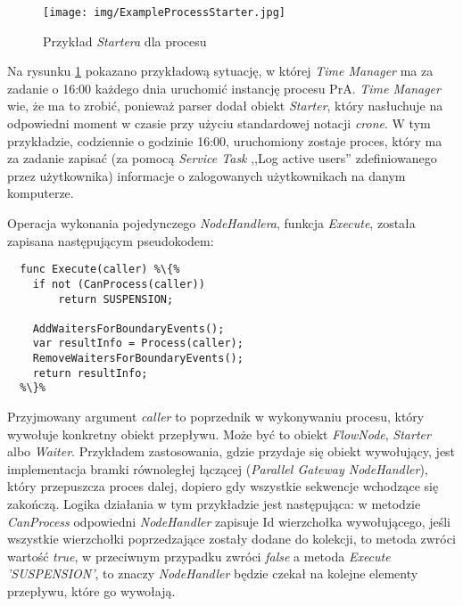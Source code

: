 \documentclass[declaration,shortabstract,mgr]{iithesis}
\begin{document}
\begin{figure}[H]
    \texttt{[image: img/ExampleProcessStarter.jpg]}
    \caption{Przykład \textit{Startera} dla procesu}
    \label{fig:process-example-starter}
\end{figure}

Na rysunku \ref{fig:process-example-starter} pokazano przykładową sytuację, w której \textit{Time Manager} ma za zadanie o 16:00 każdego dnia uruchomić instancję procesu PrA. \textit{Time Manager} wie, że ma to zrobić, ponieważ parser dodał obiekt \textit{Starter}, który nasłuchuje na odpowiedni moment w czasie przy użyciu standardowej notacji \textit{crone}. W tym przykładzie, codziennie o godzinie 16:00, uruchomiony zostaje proces, który ma za zadanie zapisać (za pomocą \textit{Service Task} ,,Log active users'' zdefiniowanego przez użytkownika) informacje o zalogowanych użytkownikach na danym komputerze.

Operacja wykonania pojedynczego \textit{NodeHandlera}, funkcja \textit{Execute}, została zapisana następującym pseudokodem:

\begin{minipage}[c]{\textwidth}
\centering
\begin{lstlisting}
  func Execute(caller) %\{%
    if not (CanProcess(caller))
        return SUSPENSION;

    AddWaitersForBoundaryEvents();
    var resultInfo = Process(caller);
    RemoveWaitersForBoundaryEvents();
    return resultInfo;  
  %\}%
\end{lstlisting}
\end{minipage}

Przyjmowany argument \textit{caller} to poprzednik w wykonywaniu procesu, który wywołuje konkretny obiekt przepływu. Może być to obiekt \textit{FlowNode}, \textit{Starter} albo \textit{Waiter}. Przykładem zastosowania, gdzie przydaje się obiekt wywołujący, jest implementacja bramki równoległej łączącej (\textit{Parallel Gateway NodeHandler}), który przepuszcza proces dalej, dopiero gdy wszystkie sekwencje wchodzące się zakończą. Logika działania w tym przykładzie jest następująca: w metodzie \textit{CanProcess} odpowiedni \textit{NodeHandler} zapisuje Id wierzchołka wywołującego, jeśli wszystkie wierzchołki poprzedzające zostały dodane do kolekcji, to metoda zwróci wartość \textit{true}, w przeciwnym przypadku zwróci \textit{false} a metoda \textit{Execute} \textit{'SUSPENSION'}, to znaczy \textit{NodeHandler} będzie czekał na kolejne elementy przepływu, które go wywołają.
\end{document}
